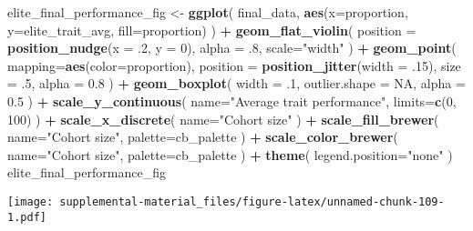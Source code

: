 \documentclass[]{book}
\newenvironment{Shaded}{\begin{snugshade}}{\end{snugshade}}
\newcommand{\DataTypeTok}[1]{\textcolor[rgb]{0.13,0.29,0.53}{#1}}
\newcommand{\DecValTok}[1]{\textcolor[rgb]{0.00,0.00,0.81}{#1}}
\newcommand{\FloatTok}[1]{\textcolor[rgb]{0.00,0.00,0.81}{#1}}
\newcommand{\KeywordTok}[1]{\textcolor[rgb]{0.13,0.29,0.53}{\textbf{#1}}}
\newcommand{\NormalTok}[1]{#1}
\newcommand{\OperatorTok}[1]{\textcolor[rgb]{0.81,0.36,0.00}{\textbf{#1}}}
\newcommand{\OtherTok}[1]{\textcolor[rgb]{0.56,0.35,0.01}{#1}}
\newcommand{\StringTok}[1]{\textcolor[rgb]{0.31,0.60,0.02}{#1}}
\begin{document}
\begin{Shaded}
\begin{Highlighting}[]
\NormalTok{elite_final_performance_fig <-}\StringTok{ }\KeywordTok{ggplot}\NormalTok{(}
\NormalTok{    final_data,}
    \KeywordTok{aes}\NormalTok{(}\DataTypeTok{x=}\NormalTok{proportion, }\DataTypeTok{y=}\NormalTok{elite_trait_avg, }\DataTypeTok{fill=}\NormalTok{proportion)}
\NormalTok{  ) }\OperatorTok{+}
\StringTok{  }\KeywordTok{geom_flat_violin}\NormalTok{(}
    \DataTypeTok{position =} \KeywordTok{position_nudge}\NormalTok{(}\DataTypeTok{x =} \FloatTok{.2}\NormalTok{, }\DataTypeTok{y =} \DecValTok{0}\NormalTok{),}
    \DataTypeTok{alpha =} \FloatTok{.8}\NormalTok{,}
    \DataTypeTok{scale=}\StringTok{"width"}
\NormalTok{  ) }\OperatorTok{+}
\StringTok{  }\KeywordTok{geom_point}\NormalTok{(}
    \DataTypeTok{mapping=}\KeywordTok{aes}\NormalTok{(}\DataTypeTok{color=}\NormalTok{proportion),}
    \DataTypeTok{position =} \KeywordTok{position_jitter}\NormalTok{(}\DataTypeTok{width =} \FloatTok{.15}\NormalTok{),}
    \DataTypeTok{size =} \FloatTok{.5}\NormalTok{,}
    \DataTypeTok{alpha =} \FloatTok{0.8}
\NormalTok{  ) }\OperatorTok{+}
\StringTok{  }\KeywordTok{geom_boxplot}\NormalTok{(}
    \DataTypeTok{width =} \FloatTok{.1}\NormalTok{,}
    \DataTypeTok{outlier.shape =} \OtherTok{NA}\NormalTok{,}
    \DataTypeTok{alpha =} \FloatTok{0.5}
\NormalTok{  ) }\OperatorTok{+}
\StringTok{  }\KeywordTok{scale_y_continuous}\NormalTok{(}
    \DataTypeTok{name=}\StringTok{"Average trait performance"}\NormalTok{,}
    \DataTypeTok{limits=}\KeywordTok{c}\NormalTok{(}\DecValTok{0}\NormalTok{, }\DecValTok{100}\NormalTok{)}
\NormalTok{  ) }\OperatorTok{+}
\StringTok{  }\KeywordTok{scale_x_discrete}\NormalTok{(}
    \DataTypeTok{name=}\StringTok{"Cohort size"}
\NormalTok{  ) }\OperatorTok{+}
\StringTok{  }\KeywordTok{scale_fill_brewer}\NormalTok{(}
    \DataTypeTok{name=}\StringTok{"Cohort size"}\NormalTok{,}
    \DataTypeTok{palette=}\NormalTok{cb_palette}
\NormalTok{  ) }\OperatorTok{+}
\StringTok{  }\KeywordTok{scale_color_brewer}\NormalTok{(}
    \DataTypeTok{name=}\StringTok{"Cohort size"}\NormalTok{,}
    \DataTypeTok{palette=}\NormalTok{cb_palette}
\NormalTok{  ) }\OperatorTok{+}
\StringTok{  }\KeywordTok{theme}\NormalTok{(}
    \DataTypeTok{legend.position=}\StringTok{"none"}
\NormalTok{  )}
\NormalTok{elite_final_performance_fig}
\end{Highlighting}
\end{Shaded}

\texttt{[image: supplemental-material\_files/figure-latex/unnamed-chunk-109-1.pdf]}
\end{document}
